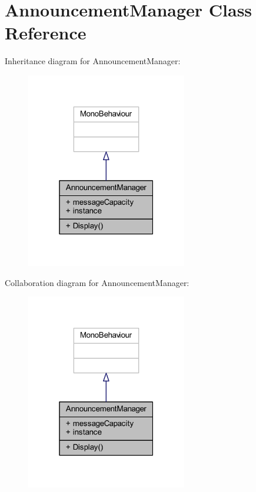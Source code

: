 \hypertarget{class_announcement_manager}{}\section{Announcement\+Manager Class Reference}
\label{class_announcement_manager}


Inheritance diagram for Announcement\+Manager\+:\nopagebreak
\begin{figure}[H]
\begin{center}
\leavevmode
\includegraphics[width=199pt]{class_announcement_manager__inherit__graph}
\end{center}
\end{figure}


Collaboration diagram for Announcement\+Manager\+:\nopagebreak
\begin{figure}[H]
\begin{center}
\leavevmode
\includegraphics[width=199pt]{class_announcement_manager__coll__graph}
\end{center}
\end{figure}
